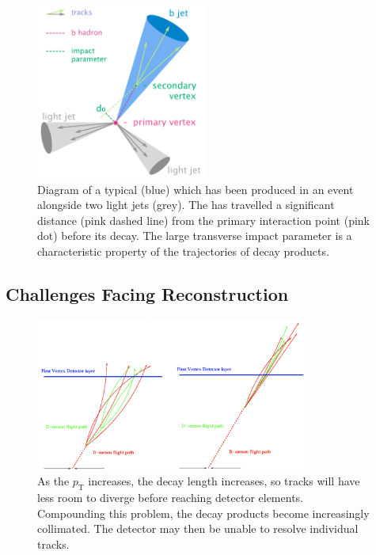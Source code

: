 \begin{figure}[!htbp]
  \centering
  \includegraphics[width=0.5\textwidth]{chapters/3.tracking/figs/b-jet-diagram.png}
  \caption{
    Diagram of a typical \bjet (blue) which has been produced in an event alongside two light jets (grey).
    The \bhadron has travelled a significant distance (pink dashed line) from the primary interaction point (pink dot) before its decay.
    The large transverse impact parameter \dzero is a characteristic property of the trajectories of \bhadron decay products.}
  \label{fig:bjet_diagram}
\end{figure}




\subsection{Challenges Facing \bhadron Reconstruction}\label{sec:b_track_reco_challenges}

\begin{figure}[!htbp]
  \centering
  \includegraphics[width=0.8\textwidth]{chapters/3.tracking/figs/high-pt-b-tracks.png}
  \caption{
    As the \bhadron $p_\text{T}$ increases, the decay length increases, so tracks will have less room to diverge before reaching detector elements.
    Compounding this problem, the decay products become increasingly collimated.
    The detector may then be unable to resolve individual tracks.
  }
  \label{fig:high_pt_b_decay}
\end{figure}

